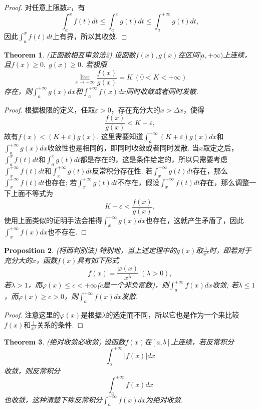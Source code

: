\documentclass{article}
\newtheorem{theorem}{Theorem}[section]
\newtheorem{proposition}[theorem]{Proposition}
\begin{document}
\begin{proof}
对任意上限数$x$，有
$$
\int_a^x f(t)dt \leq \int_a^x g(t)dt \leq \int_a^{+\infty} g(t)dt,
$$
因此$\int_a^x f(t)dt$上有界，所以其收敛.
\end{proof}

\begin{theorem}
\rm \rm {\color{red} (正函数相互审敛法2)} 设函数$f(x),g(x)$在区间$[a,+\infty)$上连续，且$f(x)\geq 0,\; g(x) \geq 0$. 若极限
$$
\lim\limits_{x \rightarrow + \infty} \frac{f(x)}{g(x)} = K~(0 <  K <  +\infty)
$$
存在，则$\int_a^{+\infty} g(x)dx$和$\int_a^{+\infty} f(x)dx$同时收敛或者同时发散. 
\end{theorem}

\begin{proof}
根据极限的定义，任取$\varepsilon > 0$，存在充分大的$x > \Delta x$，使得
$$
\frac{f(x)}{g(x)} < K + \varepsilon,
$$
故有$f(x) <  (K+\varepsilon)g(x)$. 这里需要知道$\int_a^{+\infty}(K+\varepsilon)g(x)dx$和$\int_a^{+\infty}g(x)dx$收敛性也是相同的，即同时收敛或者同时发散. 当$x$取定之后，$\int_a^{x} f(t)dt$和$\int_a^{x} g(t)dt$都是存在的，这是条件给定的，所以只需要考虑$\int_{x}^{+\infty}f(t)dt$和$\int_{x}^{+\infty}g(t)dt$反常积分存在性. 若$\int_{x}^{+\infty}g(t)dt$存在，那么$\int_{x}^{+\infty}f(t)dt$也存在; 若$\int_{x}^{+\infty}g(t)dt$不存在，假设$\int_{x}^{+\infty}f(t)dt$存在，那么调整一下上面不等式为
$$
K-\varepsilon < \frac{f(x)}{g(x)},
$$
使用上面类似的证明手法会推得$\int_{x}^{+\infty}g(x)dx$也存在，这就产生矛盾了，因此$\int_{x}^{+\infty}f(x)dx$也不存在. 
\end{proof}

\begin{proposition}
\rm {\color{red} (柯西判别法)} 特别地，当上述定理中的$g(x)$取$\frac{1}{x^\lambda}$时，即若对于充分大的$x$，函数$f(x)$具有如下形式
$$
f(x) = \frac{\varphi(x)}{x^\lambda}~(\lambda > 0),
$$
若$\lambda > 1$，而$\varphi(x) \leq c < + \infty$($c$是一个非负常数)，则$\int_a^{+\infty}f(x)dx$收敛; 若$\lambda \leq 1$，而$\varphi(x) \geq c >  0$，则$\int_a^{+\infty}f(x)dx$发散.
\end{proposition}

\begin{proof}
{\color{blue}注意这里的$\varphi(x)$是根据$\lambda$的选定而不同}，所以它也是作为一个来比较$f(x)$和$\frac{1}{x^\lambda}$关系的条件. 
\end{proof}

\begin{theorem}
\rm {\color{red} (绝对收敛必收敛)} 设函数$f(x)$在$[a,b]$上连续，若反常积分
$$
\int_a^{+\infty} |f(x)|dx
$$
收敛，则反常积分
$$
\int_a^{+\infty} f(x)dx
$$
也收敛，这种清楚下称反常积分$\int_a^{+\infty} f(x)dx$为{\color{red}绝对收敛}.
\end{theorem}
\end{document}
